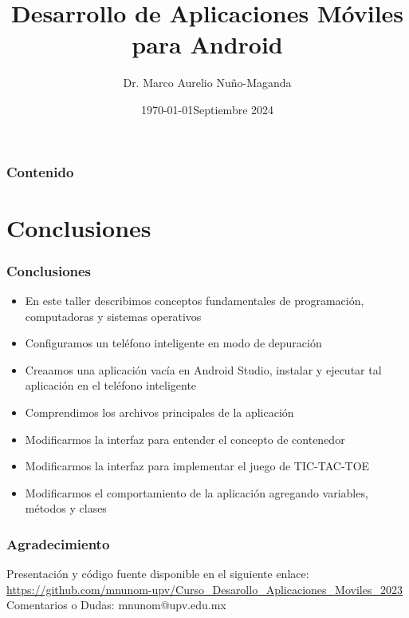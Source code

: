 \documentclass[pdf,
serif,
compress,
xcolor=table,
dvipsnames,
spanish,
aspectratio=169]{beamer}
\date{\specialdate\today}
\title{Desarrollo de Aplicaciones M\'oviles para Android}
\author[Dr. Marco Aurelio Nuño-Maganda]{Dr. Marco Aurelio Nuño-Maganda}
\institute[UPV]{Universidad Politecnica de Victoria\\\url{https://github.com/mnunom-upv/Curso_Desarollo_Aplicaciones_Moviles_2023}}
\date[]{Septiembre 2024}
\begin{document}
\begin{frame}[plain]
  \titlepage
\end{frame}

\begin{frame}
\frametitle{Contenido}  
  \tableofcontents
\end{frame}

%
%








\section{Conclusiones} 
\begin{frame}
\frametitle{Conclusiones}  
\begin{itemize}
\item En este taller describimos conceptos fundamentales de programaci\'on, computadoras y sistemas operativos
\item Configuramos un tel\'efono inteligente en modo de depuraci\'on
\item Creaamos una aplicaci\'on vac\'ia en Android Studio, instalar y ejecutar tal aplicaci\'on en el tel\'efono inteligente
\item Comprendimos los archivos principales de la aplicaci\'on
\item Modificarmos la interfaz para entender el concepto de contenedor
\item Modificarmos la interfaz para implementar el juego de TIC-TAC-TOE
\item Modificarmos el comportamiento de la aplicaci\'on agregando variables, m\'etodos y clases 
\end{itemize}
\end{frame}

\begin{frame}
\frametitle{Agradecimiento}  
Presentaci\'on y c\'odigo fuente disponible en el siguiente enlace:\\
\url{https://github.com/mnunom-upv/Curso_Desarollo_Aplicaciones_Moviles_2023}\\
Comentarios o Dudas: mnunom@upv.edu.mx
\end{frame}
\end{document}
